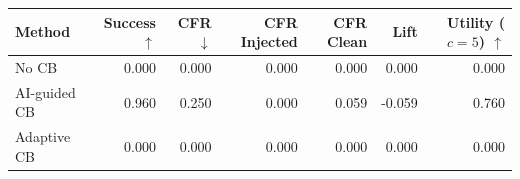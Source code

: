 \begin{tabular}{lrrrrrr}
\toprule
Method & Success $\uparrow$ & CFR $\downarrow$ & CFR Injected & CFR Clean & Lift & Utility ($c=5$) $\uparrow$ \\
\midrule
No CB & 0.000 & 0.000 & 0.000 & 0.000 & 0.000 & 0.000 \\
AI-guided CB & 0.960 & 0.250 & 0.000 & 0.059 & -0.059 & 0.760 \\
Adaptive CB & 0.000 & 0.000 & 0.000 & 0.000 & 0.000 & 0.000 \\
\bottomrule
\end{tabular}
